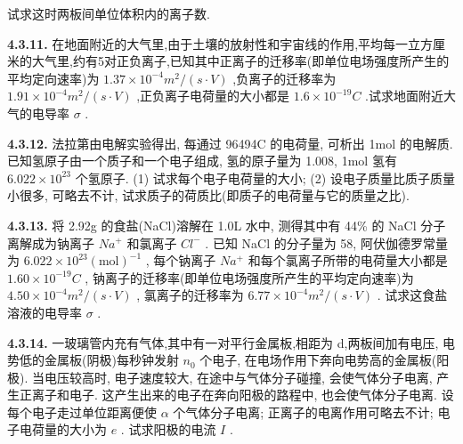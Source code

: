 试求这时两板间单位体积内的离子数.

\vfill
\newpage

\textbf{4.3.11.} 在地面附近的大气里,由于土壤的放射性和宇宙线的作用,平均每一立方厘米的大气里,约有5对正负离子,已知其中正离子的迁移率(即单位电场强度所产生的平均定向速率)为 $1.37\times10^{-4}m^{2}/(s\cdot V)$ ,负离子的迁移率为 $1.91\times10^{-4}m^{2}/(s\cdot V)$ ,正负离子电荷量的大小都是 $1.6\times10^{-19}C$ .试求地面附近大气的电导率 $\sigma$ .

\vfill
\newpage

\textbf{4.3.12.} 法拉第由电解实验得出, 每通过 96494C 的电荷量, 可析出 1mol 的电解质. 已知氢原子由一个质子和一个电子组成, 氢的原子量为 1.008, 1mol 氢有 $6.022 \times 10^{23}$ 个氢原子. (1) 试求每个电子电荷量的大小; (2) 设电子质量比质子质量小很多, 可略去不计, 试求质子的荷质比(即质子的电荷量与它的质量之比).

\vfill
\newpage

\textbf{4.3.13.} 将 2.92g 的食盐(NaCl)溶解在 1.0L 水中, 测得其中有 44\% 的 NaCl 分子离解成为钠离子 $Na^{+}$ 和氯离子 $Cl^{-}$ . 已知 NaCl 的分子量为 58, 阿伏伽德罗常量为 $6.022 \times 10^{23} (\text{mol})^{-1}$ , 每个钠离子 $Na^{+}$ 和每个氯离子所带的电荷量大小都是 $1.60 \times 10^{-19} C$ , 钠离子的迁移率(即单位电场强度所产生的平均定向速率)为 $4.50 \times 10^{-4} m^{2}/(s \cdot V)$ , 氯离子的迁移率为 $6.77 \times 10^{-4} m^{2}/(s \cdot V)$ . 试求这食盐溶液的电导率 $\sigma$ .

\vfill
\newpage

\textbf{4.3.14.} 一玻璃管内充有气体,其中有一对平行金属板,相距为 d,两板间加有电压, 电势低的金属板(阴极)每秒钟发射 $n_0$ 个电子, 在电场作用下奔向电势高的金属板(阳极). 当电压较高时, 电子速度较大, 在途中与气体分子碰撞, 会使气体分子电离, 产生正离子和电子. 这产生出来的电子在奔向阳极的路程中, 也会使气体分子电离. 设每个电子走过单位距离便使 $\alpha$ 个气体分子电离; 正离子的电离作用可略去不计; 电子电荷量的大小为 $e$ . 试求阳极的电流 $I$ .

\vfill
\newpage
